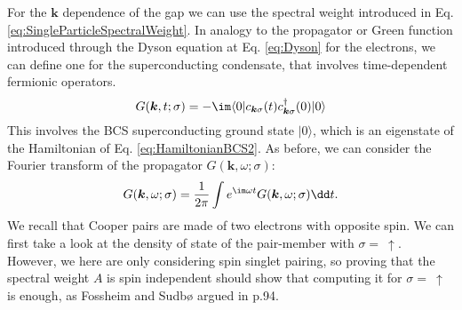 \documentclass[../main.tex]{subfile}
\begin{document}
For the $\bm{k}$ dependence of the gap we can use the spectral weight introduced in Eq. \ref{eq:SingleParticleSpectralWeight}.
In analogy to the propagator or Green function introduced through the Dyson equation at Eq. \ref{eq:Dyson} for the electrons, we can define one for the 
superconducting condensate, that involves time-dependent fermionic operators.
\[
    G(\bm{k}, t; \sigma) = - \im \langle 0 | c_{\bm{k}\sigma}(t) c_{\bm{k}\sigma}^{\dagger}(0) | 0 \rangle
\]
This involves the BCS superconducting ground state $|0\rangle$, which is an eigenstate of the Hamiltonian of Eq. \ref{eq:HamiltonianBCS2}. As before, we can consider
the Fourier transform of the propagator $G(\bm{k}, \omega; \sigma)$:
\[
    G(\bm{k}, \omega; \sigma) = \frac{1}{2\pi} \int e^{\im\omega t} G(\bm{k}, \omega; \sigma)\dd t.
\] 
We recall that Cooper pairs are made of two electrons with opposite spin. We can first take a 
look at the density of state of the pair-member with $\sigma =~ \uparrow$. 
However, we here are only considering spin singlet pairing, so proving that the spectral weight $A$ is spin independent should
show that computing it for $\sigma =~ \uparrow$ is enough, as Fossheim and Sudbø argued in \cite{FossheimSudbo2004} p.94.
\end{document}
